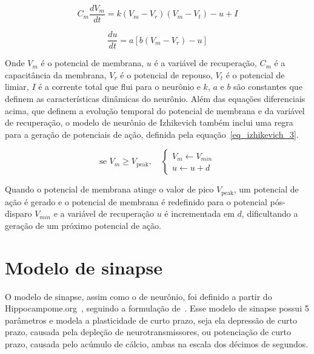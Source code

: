 
\begin{equation}
\label{eq_izhikevich_1}
C_m \frac{dV_m}{dt} = k (V_m - V_r)(V_m - V_t) - u + I
\end{equation}

\begin{equation}
\label{eq_izhikevich_2}
\frac{du}{dt} = a [b(V_m-V_r) - u]
\end{equation}

Onde $V_m$ é o potencial de membrana, $u$ é a variável de recuperação, $C_m$ é a capacitância da membrana, $V_r$ é o
potencial de repouso, $V_t$ é o potencial de limiar, $I$ é a corrente total que flui para o neurônio e $k$, $a$ e $b$ são
constantes que definem as características dinâmicas do neurônio. Além das equações diferenciais acima, que definem a evolução
temporal do potencial de membrana e da variável de recuperação, o modelo de neurônio de Izhikevich também inclui uma regra para
a geração de potenciais de ação, definida pela equação~\ref{eq_izhikevich_3}.

\begin{equation}
\label{eq_izhikevich_3}
\text{se } V_m \geq V_{\text{peak}}, \quad
\begin{cases}
V_m \gets V_{min} \\
u \gets u + d
\end{cases}
\end{equation}

Quando o potencial de membrana atinge o valor de pico $V_{\text{peak}}$, um potencial de ação é gerado e o potencial de membrana é
redefinido para o potencial pós-disparo $V_{min}$ e a variável de recuperação $u$ é incrementada em $d$, dificultando a geração de
um próximo potencial de ação.



\section{Modelo de sinapse}

O modelo de sinapse, assim como o de neurônio, foi definido a partir do Hippocampome.org~\cite{wheelerHippocampomeorg2023},
seguindo a formulação de~. Esse modelo de sinapse possui 5 parâmetros
e modela a
plasticidade de curto prazo, seja ela depressão de curto prazo, causada pela depleção de neurotransmissores, ou potenciação de
curto prazo, causada pelo acúmulo de cálcio, ambas na escala dos décimos de segundos.


